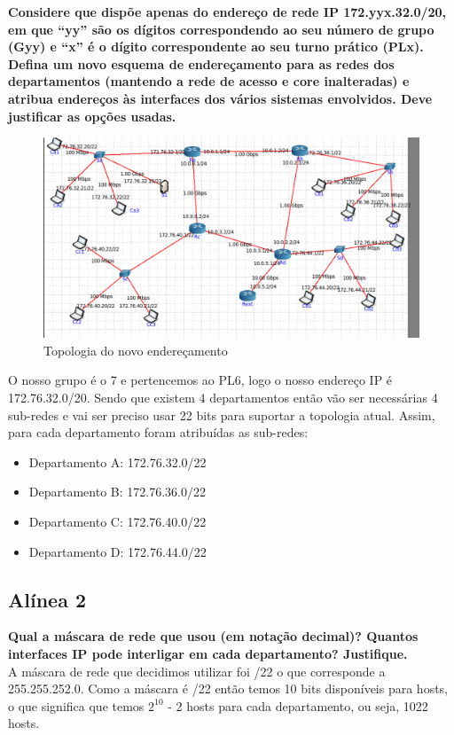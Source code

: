 \documentclass[a4paper]{report}
\begin{document}
\textbf{Considere que dispõe apenas do endereço de rede IP 172.yyx.32.0/20, em
que “yy” são os dígitos correspondendo ao seu número de grupo (Gyy) e “x” é o
dígito correspondente ao seu turno prático (PLx). Defina um novo esquema de
endereçamento para as redes dos departamentos (mantendo a rede de acesso e core
inalteradas) e atribua endereços às interfaces dos vários sistemas envolvidos.
Deve justificar as opções usadas.}

\begin{figure}[H]
    \centering 
    \includegraphics[width=\textwidth]{images/topCoreEx3.png}
    \caption{Topologia do novo endereçamento}
    \label{fig:topCoreEx3}
\end{figure}
O nosso grupo é o 7 e pertencemos ao PL6, logo o nosso endereço IP é 172.76.32.0/20.
Sendo que existem 4 departamentos então vão ser necessárias 4 sub-redes e
vai ser preciso usar 22 bits para suportar a topologia atual.
Assim, para cada departamento foram atribuídas as sub-redes:
\begin{itemize}
    \item Departamento A: 172.76.32.0/22
    \item Departamento B: 172.76.36.0/22
    \item Departamento C: 172.76.40.0/22
    \item Departamento D: 172.76.44.0/22
\end{itemize}


\subsection{Alínea 2}
\textbf{Qual a máscara de rede que usou (em notação decimal)? Quantos interfaces
IP pode interligar em cada departamento? Justifique.}\\
A máscara de rede que decidimos utilizar foi /22 o que corresponde a 255.255.252.0.
Como a máscara é /22 então temos 10 bits disponíveis para hosts, o que significa que 
temos $2^{10}$ - 2 hosts para cada departamento, ou seja, 1022 hosts.
\end{document}
